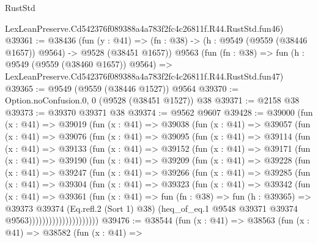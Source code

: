 \begin{lexlean}{RustStd}
\begin{coremodule}
    LexLeanPreserve.Cd542376f089388a4a783f2fc4c26811f.R44.RustStd.fun46)
@39361 := @38436
    (fun (y : @41) =>
    (fn : @38) -> (h : @9549 (@9559 (@38446 @1657)) @9564) -> @9528 (@38451 @1657))
    @9563
    (fun (fn : @38) =>
    fun (h : @9549 (@9559 (@38460 @1657)) @9564) =>
    LexLeanPreserve.Cd542376f089388a4a783f2fc4c26811f.R44.RustStd.fun47)
@39365 := @9549 (@9559 (@38446 @1527)) @9564
@39370 := Option.noConfusion.{0, 0} (@9528 (@38451 @1527)) @38
@39371 := @2158 @38
@39373 := @39370 @39371 @38
@39374 := @9562 @9607
@39428 := @39000
    (fun (x : @41) =>
    @39019
      (fun (x : @41) =>
      @39038
        (fun (x : @41) =>
        @39057
          (fun (x : @41) =>
          @39076
            (fun (x : @41) =>
            @39095
              (fun (x : @41) =>
              @39114
                (fun (x : @41) =>
                @39133
                  (fun (x : @41) =>
                  @39152
                    (fun (x : @41) =>
                    @39171
                      (fun (x : @41) =>
                      @39190
                        (fun (x : @41) =>
                        @39209
                          (fun (x : @41) =>
                          @39228
                            (fun (x : @41) =>
                            @39247
                              (fun (x : @41) =>
                              @39266
                                (fun (x : @41) =>
                                @39285
                                  (fun (x : @41) =>
                                  @39304
                                    (fun (x : @41) =>
                                    @39323
                                      (fun (x : @41) =>
                                      @39342
                                        (fun (x : @41) =>
                                        @39361
                                          (fun (x : @41) =>
                                          fun (fn : @38) =>
                                          fun (h : @39365) =>
                                          @39373
                                            @39374
                                            (Eq.refl.{2} (Sort 1) @38)
                                            (heq_of_eq.{1}
                                              @9548
                                              @39371
                                              @39374
                                              @9563)))))))))))))))))))))
@39476 := @38544
    (fun (x : @41) =>
    @38563
      (fun (x : @41) =>
      @38582
        (fun (x : @41) =>

\end{coremodule}
\end{lexlean}
